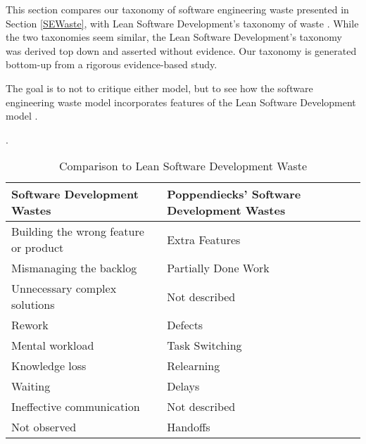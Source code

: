 This section compares our taxonomy of software engineering waste presented in Section \ref{SEWaste}, with Lean Software Development's taxonomy of waste \cite{PoppendieckConceptToCash}. While the two taxonomies seem similar, the Lean Software Development's taxonomy was derived top down and asserted without evidence. Our taxonomy is generated bottom-up from a rigorous evidence-based study. 

The goal is to not to critique either model, but to see how the software engineering waste model incorporates features of the Lean Software Development model \cite{PoppendieckConceptToCash}. 

 \cite{GlaserTheoreticalSensitivity}. 


\begin{table}[t]
\renewcommand{\arraystretch}{1.5}
\centering
\caption{Comparison to Lean Software Development Waste}
\label{LeanSoftwareDevelopmentComparisonTable}
\begin{tabular}{|l|l|}
\hline
Software Development Wastes           & Poppendiecks' Software Development Wastes \\ \hline
Building the wrong feature or product & Extra Features                            \\ \hline
Mismanaging the backlog               & Partially Done Work                            \\ \hline
Unnecessary complex solutions                & Not described                             \\ \hline
Rework                                & Defects                                   \\ \hline
Mental workload                 & Task Switching  \\ \hline
Knowledge loss                 & Relearning                            \\ \hline
Waiting                               & Delays                                    \\ \hline
Ineffective communication             & Not described                             \\ \hline
Not observed                          & Handoffs                                  \\ \hline
\end{tabular}
\end{table}

